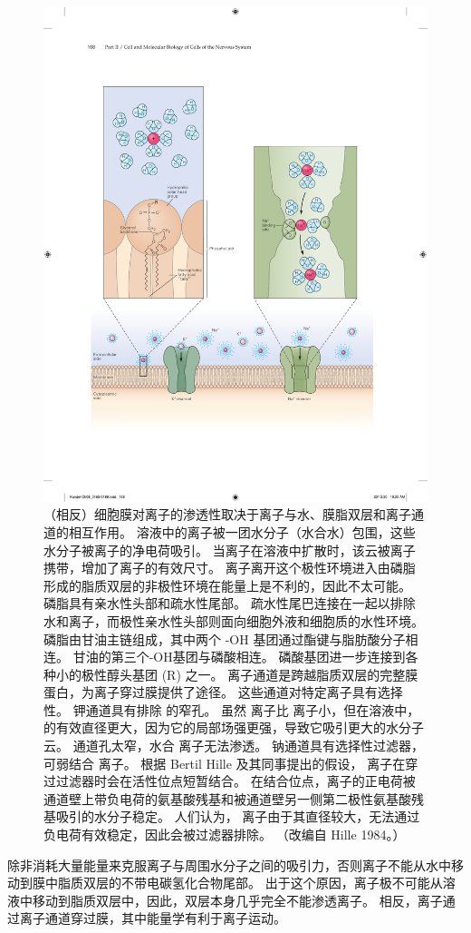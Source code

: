 \begin{figure}[htbp]
	\centering
	\includegraphics[width=0.6\linewidth]{chap08/fig_8_1}
	\caption{（相反）细胞膜对离子的渗透性取决于离子与水、膜脂双层和离子通道的相互作用。 溶液中的离子被一团水分子（水合水）包围，这些水分子被离子的净电荷吸引。 当离子在溶液中扩散时，该云被离子携带，增加了离子的有效尺寸。 离子离开这个极性环境进入由磷脂形成的脂质双层的非极性环境在能量上是不利的，因此不太可能。 磷脂具有亲水性头部和疏水性尾部。 疏水性尾巴连接在一起以排除水和离子，而极性亲水性头部则面向细胞外液和细胞质的水性环境。 磷脂由甘油主链组成，其中两个 -OH 基团通过酯键与脂肪酸分子相连。 甘油的第三个-OH基团与磷酸相连。 磷酸基团进一步连接到各种小的极性醇头基团 (R) 之一。 离子通道是跨越脂质双层的完整膜蛋白，为离子穿过膜提供了途径。 这些通道对特定离子具有选择性。 钾通道具有排除  的窄孔。 虽然  离子比  离子小，但在溶液中， 的有效直径更大，因为它的局部场强更强，导致它吸引更大的水分子云。  通道孔太窄，水合  离子无法渗透。 钠通道具有选择性过滤器，可弱结合  离子。 根据 Bertil Hille 及其同事提出的假设， 离子在穿过过滤器时会在活性位点短暂结合。 在结合位点，离子的正电荷被通道壁上带负电荷的氨基酸残基和被通道壁另一侧第二极性氨基酸残基吸引的水分子稳定。 人们认为， 离子由于其直径较大，无法通过负电荷有效稳定，因此会被过滤器排除。 （改编自 Hille 1984。）}
	\label{fig:8_1}
\end{figure}


除非消耗大量能量来克服离子与周围水分子之间的吸引力，否则离子不能从水中移动到膜中脂质双层的不带电碳氢化合物尾部。
出于这个原因，离子极不可能从溶液中移动到脂质双层中，因此，双层本身几乎完全不能渗透离子。
相反，离子通过离子通道穿过膜，其中能量学有利于离子运动。


